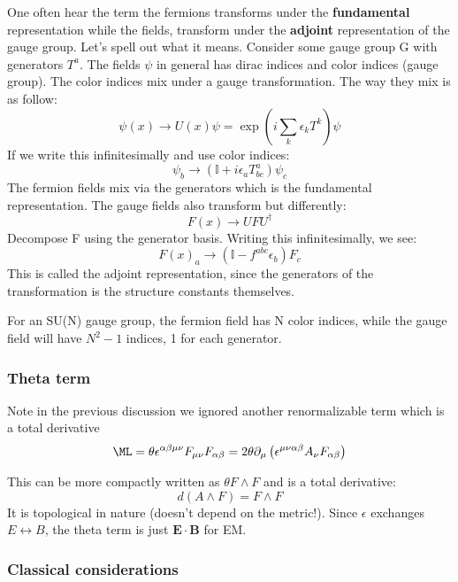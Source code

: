 \documentclass[11pt]{scrartcl}
\begin{document}
\begin{example}
	One often hear the term the fermions transforms under the \textbf{fundamental} representation while the fields, transform under the \textbf{adjoint} representation of the gauge group.  Let's spell out what it means.
	Consider some gauge group G with generators $T^a$.
	The fields $\psi$ in general has dirac indices and color indices (gauge group).
	The color indices mix under a gauge transformation.  The way they mix is as follow:
	\[\psi (x) \rightarrow U(x) \psi = \exp \left(i \sum_k \epsilon_k T^{k} \right) \psi \]
	If we write this infinitesimally and use color indices:
	\[\psi_b \rightarrow (\mathbb{I} + i \epsilon_a T^{a}_{bc}) \psi_c \]
	The fermion fields mix via the generators which is the fundamental representation.
	The gauge fields also transform but differently:
	\[F(x) \rightarrow U F U^\dagger \]
	Decompose F using the generator basis.
	Writing this infinitesimally, we see:
	\[F(x)_a \rightarrow (\mathbb{I} - f^{abc} \epsilon_b) F_c\]
	This is called the adjoint representation, since the generators of the transformation is the structure constants themselves.
	
	For an SU(N) gauge group, the fermion field has N color indices, while the gauge field will have $N^2-1$ indices, 1 for each generator.
\end{example}


\subsubsection{Theta term}
Note in the previous discussion we ignored another renormalizable term which is a total derivative
\begin{align}
	\ML = \theta \epsilon^{\alpha \beta \mu \nu} F_{\mu \nu} F_{\alpha \beta} = 2 \theta \partial_\mu \left( \epsilon^{\mu \nu \alpha \beta} A_{\nu} F_{\alpha \beta} \right)
	\end{align}

This can be more compactly written as $\theta F \wedge F$ and is a total derivative:
\[d(A \wedge F) = F \wedge F \]  
It is topological in nature (doesn't depend on the metric!).  Since $\epsilon$ exchanges $E \leftrightarrow B$, the theta term is just $\mathbf{E} \cdot \mathbf{B}$ for EM.

\subsubsection{Classical considerations}
\end{document}

